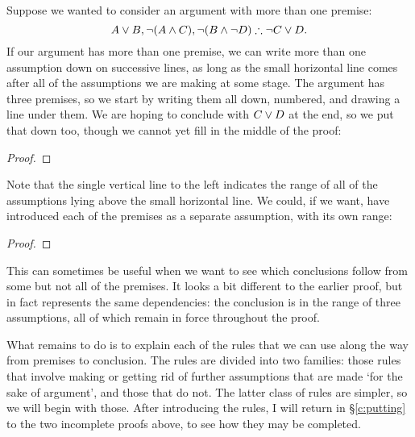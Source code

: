 Suppose we wanted to consider an argument with more than one premise:
$$A\vee B, \neg (A\wedge C), \neg (B \wedge \neg D) \mathrel{\therefore} \neg C\vee D.$$
If our argument has more than one premise, we can write more than one assumption down on successive lines, as long as the small horizontal line comes after all of the assumptions we are making at some stage. The argument has three premises, so we start by writing them all down, numbered, and drawing a line under them. We are hoping to conclude with $C \vee D$ at the end, so we put that down too, though we cannot yet fill in the middle of the proof:
\begin{proof}
\end{proof}
Note that the single vertical line to the left indicates the range of all of the assumptions lying above the small horizontal line. We could, if we want, have introduced each of the premises as a separate assumption, with its own range: 
\begin{proof}
	\open{}
	\open{}
\end{proof}
This can sometimes be useful when we want to see which conclusions follow from some but not all of the premises. It looks a bit different to the earlier proof, but in fact represents the same dependencies: the conclusion is in the range of three assumptions, all of which remain in force throughout the proof.


What remains to do is to explain each of the rules that we can use along the way from premises to conclusion. The rules are divided into two families: those rules that involve making or getting rid of further assumptions that are made `for the sake of argument', and those that do not. The latter class of rules are simpler, so we will begin with those. After introducing the rules, I will return in §\ref{c:putting} to the two incomplete proofs above, to see how they may be completed.


